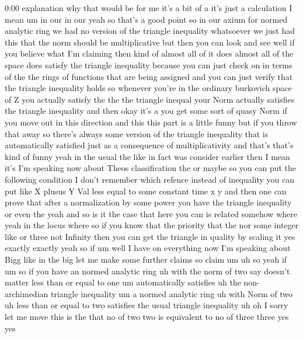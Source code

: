 \begin{unfinished}{0:00}
explanation  why  that  would  be  for  me
it's  a  bit  of  a  it's  just  a  calculation
I  mean  um  in  our  in  our  yeah  so  that's  a
good  point  so  in  our  axium  for  normed
analytic  ring  we  had  no  version  of  the
triangle  inequality  whatsoever  we  just
had  this  that  the  norm  should  be
multiplicative  but  then  you  can  look  and
see  well  if  you  believe  what  I'm
claiming  then  kind  of  almost  all  of  it
does  almost  all  of  the  space  does
satisfy  the  triangle  inequality  because
you  can  just  check  on  in  terms  of  the
the  rings  of  functions  that  are  being
assigned  and  you  can  just  verify  that
the  triangle  inequality  holds  so
whenever  you're  in  the  ordinary
burkovich  space  of  Z  you  actually
satisfy  the  the  the  triangle  inequal
your  Norm  actually  satisfies  the
triangle  inequality  and  then  okay  it's  a
you  get  some  sort  of  quasy  Norm  if  you
move  out  in  this  direction  and  this  this
part  is  a  little  funny  but  if  you  throw
that  away  so  there's  always  some  version
of  the  triangle  inequality  that  is
automatically  satisfied  just  as  a
consequence  of  multiplicativity  and
that's  that's  kind  of  funny  yeah  in  the
usual  the  like  in  fact  was  consider
earlier  then  I  mean  it's  I'm  speaking
now  about  Theos  classification  the  or
maybe  so  you  can  put  the  following
condition  I  don't  remember  which  refence
instead  of  inequality  you  can  put  like  X
plusus  Y  Val  less  equal  to  some  constant
time  x  y  and  then  one  can  prove  that
after  a  normalization  by  some  power  you
have  the  triangle  inequality  or  even  the
yeah  and  so  is  it  the  case  that  here  you
can  is  related  somehow  where  yeah  in  the
locus  where  so  if  you  know  that  the
priority  that  the  nor  some  integer  like
or  three  not  Infinity  then  you  can  get
the  triangle  in  quality  by  scaling  it
yes  exactly  exactly  yeah  so  if  um  well  I
have  on  everything  now  I'm  speaking
about  Bigg
like  in  the  big  let  me  make  some  further
claims  so  claim
um  uh  so  yeah  if  um  so  if  you  have  an
normed  analytic
ring  uh  with  the  norm  of  two  say  doesn't
matter  less  than  or  equal  to  one  um
automatically
satisfies  uh  the  non-  archimedian
triangle
inequality
um  a  normed  analytic
ring  uh
with  Norm  of  two  uh  less  than  or  equal
to  two  satisfies  the  usual  triangle
inequality  uh  oh  I  sorry  let  me
move  this  is  the  that  no  of  two  two  is
equivalent  to  no  of  three  three  yes  yes

\end{unfinished}
